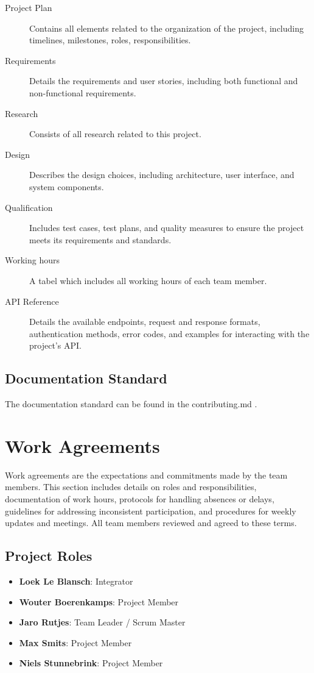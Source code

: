 \documentclass{projdoc}
\begin{document}
\begin{description}
	\item[Project Plan] Contains all elements related to the organization of the
	 project, including timelines, milestones, roles, responsibilities.
	\item[Requirements] Details the requirements and 
	user stories, including both functional and non-functional requirements. 
	\item[Research] Consists of all research related to this project.
	\item[Design] Describes the design choices, including architecture,
	 user interface, and system components.
	\item[Qualification] Includes test cases, test plans, and quality 
	measures to ensure the project meets its requirements and standards.
	\item[Working hours] A tabel which includes all working hours of each team member.
	\item[API Reference] Details the available endpoints, request and response formats, authentication methods, error codes, and examples for interacting with the project's API.
\end{description}

\subsection{Documentation Standard}
The documentation standard can be found in the contributing.md \autocite{crepe:docs-standard}.


\section{Work Agreements}
Work agreements are the expectations and commitments made by the team members. 
This section includes details on roles and responsibilities, documentation of 
work hours, protocols for handling absences or delays, guidelines for addressing
 inconsistent participation, and procedures for weekly updates and meetings. All
  team members reviewed and agreed to these terms.

\subsection{Project Roles}
\begin{itemize}
	\item \textbf{Loek Le Blansch}: Integrator
	\item \textbf{Wouter Boerenkamps}: Project Member
	\item \textbf{Jaro Rutjes}: Team Leader / Scrum Master
	\item \textbf{Max Smits}: Project Member
	\item \textbf{Niels Stunnebrink}: Project Member
\end{itemize}
\end{document}
